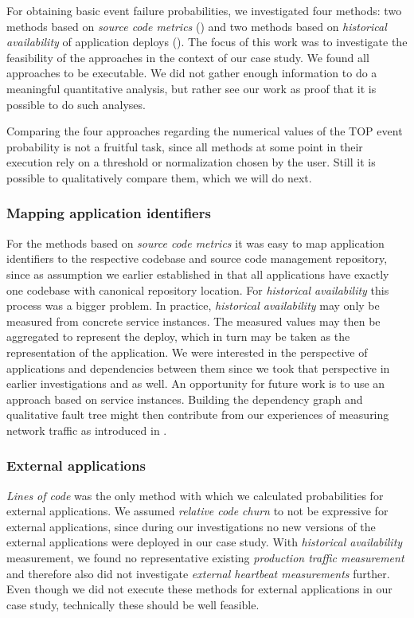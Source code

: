 For obtaining basic event failure probabilities, we investigated four methods: two methods based on \emph{source code metrics} () and two methods based on \emph{historical availability} of application deploys (). The focus of this work was to investigate the feasibility of the approaches in the context of our case study. We found all approaches to be executable. We did not gather enough information to do a meaningful quantitative analysis, but rather see our work as proof that it is possible to do such analyses.

Comparing the four approaches regarding the numerical values of the TOP event probability is not a fruitful task, since all methods at some point in their execution rely on a threshold or normalization chosen by the user. Still it is possible to qualitatively compare them, which we will do next.

\subsubsection{Mapping application identifiers}

For the methods based on \emph{source code metrics} it was easy to map application identifiers to the respective codebase and source code management repository, since as assumption we earlier established in  that all applications have exactly one codebase with canonical repository location. For \emph{historical availability} this process was a bigger problem. In practice, \emph{historical availability} may only be measured from concrete service instances. The measured values may then be aggregated to represent the deploy, which in turn may be taken as the representation of the application. We were interested in the perspective of applications and dependencies between them since we took that perspective in earlier investigations  and  as well. An opportunity for future work is to use an approach based on service instances. Building the dependency graph and qualitative fault tree might then contribute from our experiences of measuring network traffic as introduced in .

\subsubsection{External applications}

\emph{Lines of code} was the only method with which we calculated probabilities for external applications. We assumed \emph{relative code churn} to not be expressive for external applications, since during our investigations no new versions of the external applications were deployed in our case study. With \emph{historical availability} measurement, we found no representative existing \emph{production traffic measurement} and therefore also did not investigate \emph{external heartbeat measurements} further. Even though we did not execute these methods for external applications in our case study, technically these should be well feasible.

